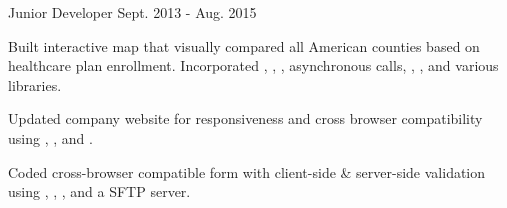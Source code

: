 \begin{cventries}
  \cventry
    {Junior Developer} %
    {} %
    {} %
    {Sept. 2013 - Aug. 2015} %
    {
      \begin{cvitems} %
        \item {Built interactive map that visually compared all American counties based on healthcare plan enrollment. Incorporated , , , asynchronous  calls, , ,  and various  libraries.}
        \item {Updated company website for responsiveness and cross browser compatibility using , , and .}
        \item {Coded cross-browser compatible form with client-side \& server-side validation using , , ,  and a SFTP server.}
      \end{cvitems}
    }


\end{cventries}
